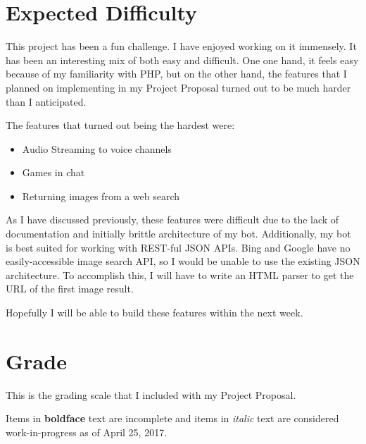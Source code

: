 \documentclass[12pt]{article} %
\begin{document}
\section{Expected Difficulty}

This project has been a fun challenge. I have enjoyed working on it immensely. It has been an interesting mix of both easy and difficult. One one hand, it feels easy because of my familiarity with PHP, but on the other hand, the features that I planned on implementing in my Project Proposal turned out to be much harder than I anticipated.

The features that turned out being the hardest were:

\begin{itemize}
    \item Audio Streaming to voice channels
    \item Games in chat
    \item Returning images from a web search
\end{itemize}

As I have discussed previously, these features were difficult due to the lack of documentation and initially brittle architecture of my bot. Additionally, my bot is best suited for working with REST-ful JSON APIs. Bing and Google have no easily-accessible image search API, so I would be unable to use the existing JSON architecture. To accomplish this, I will have to write an HTML parser to get the URL of the first image result.

Hopefully I will be able to build these features within the next week.


\section{Grade}

This is the grading scale that I included with my Project Proposal.

Items in \textbf{boldface} text are incomplete and items in \textit{italic} text are considered work-in-progress as of April 25, 2017.
\end{document}
